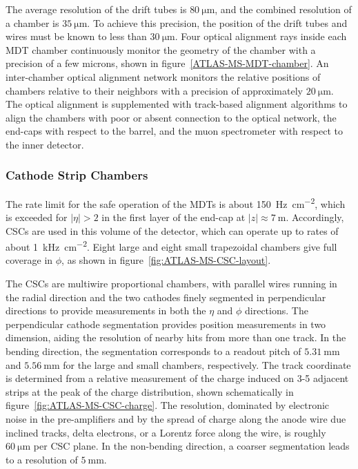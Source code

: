 The average resolution of the drift tubes is $\SI{80}{\micro\meter}$, and the combined resolution of a chamber is $\SI{35}{\micro\meter}$. To achieve this precision, the position of the drift tubes and wires must be known to less than $\SI{30}{\micro\meter}$. Four optical alignment rays inside each MDT chamber continuously monitor the geometry of the chamber with a precision of a few microns, shown in figure~\ref{ATLAS-MS-MDT-chamber}. An inter-chamber optical alignment network monitors the relative positions of chambers relative to their neighbors with a precision of approximately $\SI{20}{\micro\meter}$. The optical alignment is supplemented with track-based alignment algorithms to align the chambers with poor or absent connection to the optical network, the end-caps with respect to the barrel, and the muon spectrometer with respect to the inner detector.




\subsubsection{Cathode Strip Chambers}
The rate limit for the safe operation of the MDTs is about \SI[per-mode=symbol]{150}{\hertz\per\centi\meter\tothe{2}}, which is exceeded for $|\eta|>2$ in the first layer of the end-cap at $|z|\approx \SI{7}{\meter}$. Accordingly, CSCs are used in this volume of the detector, which can operate up to rates of about \SI[per-mode=symbol]{1}{\kilo\hertz\per\centi\meter\tothe{2}}. Eight large and eight small trapezoidal chambers give full coverage in $\phi$, as shown in figure~\ref{fig:ATLAS-MS-CSC-layout}.  

The CSCs are multiwire proportional chambers, with parallel wires running in the radial direction and the two cathodes finely segmented in perpendicular directions to provide measurements in both the $\eta$ and $\phi$ directions. The perpendicular cathode segmentation provides position measurements in two dimension, aiding the resolution of nearby hits from more than one track. In the bending direction, the segmentation corresponds to a readout pitch of $\SI{5.31}{\milli\meter}$ and $\SI{5.56}{\milli\meter}$ for the large and small chambers, respectively.  The track coordinate is determined from a relative measurement of the charge induced on 3-5 adjacent strips at the peak of the charge distribution, shown schematically in figure~\ref{fig:ATLAS-MS-CSC-charge}. The resolution, dominated by electronic noise in the pre-amplifiers and by the spread of charge along the anode wire due inclined tracks, delta electrons, or a Lorentz force along the wire, is roughly $\SI{60}{\micro\meter}$ per CSC plane. In the non-bending direction, a coarser segmentation leads to a resolution of $\SI{5}{\milli\meter}$. 

